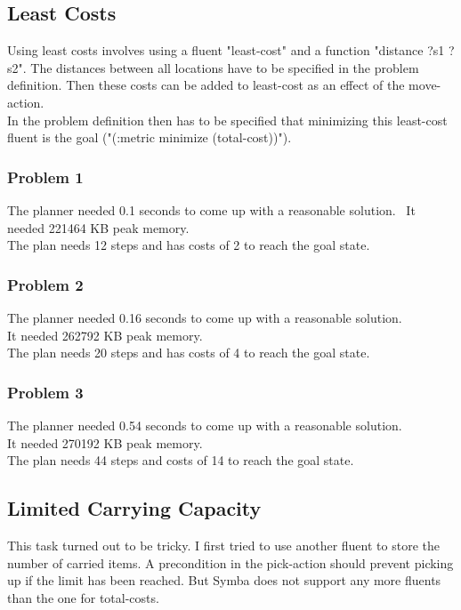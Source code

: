 \documentclass[paper=a4, fontsize=11pt]{scrartcl} %
\numberwithin{equation}{section} %
\numberwithin{figure}{section} %
\numberwithin{table}{section} %
\begin{document}
\subsection{Least Costs}
Using least costs involves using a fluent "least-cost" and a function "distance ?s1 ?s2". The distances between all locations have to be specified in the problem definition. Then these costs can be added to least-cost as an effect of the move-action.\\
In the problem definition then has to be specified that minimizing this least-cost fluent is the goal ("(:metric minimize (total-cost))").

\subsubsection{Problem 1}
The planner needed 0.1 seconds to come up with a reasonable solution. \
It needed 221464 KB peak memory.\\
The plan needs 12 steps and has costs of 2 to reach the goal state.

\subsubsection{Problem 2}
The planner needed 0.16 seconds to come up with a reasonable solution. \\
It needed 262792 KB peak memory.\\
The plan needs 20 steps and has costs of 4 to reach the goal state.

\subsubsection{Problem 3}
The planner needed 0.54 seconds to come up with a reasonable solution. \\
It needed 270192 KB peak memory.\\
The plan needs 44 steps and costs of 14 to reach the goal state.

\subsection{Limited Carrying Capacity}
This task turned out to be tricky.
I first tried to use another fluent to store the number of carried items.
A precondition in the pick-action should prevent picking up if the limit has been reached.
But Symba does not support any more fluents than the one for total-costs.\vspace{5mm}
\end{document}
